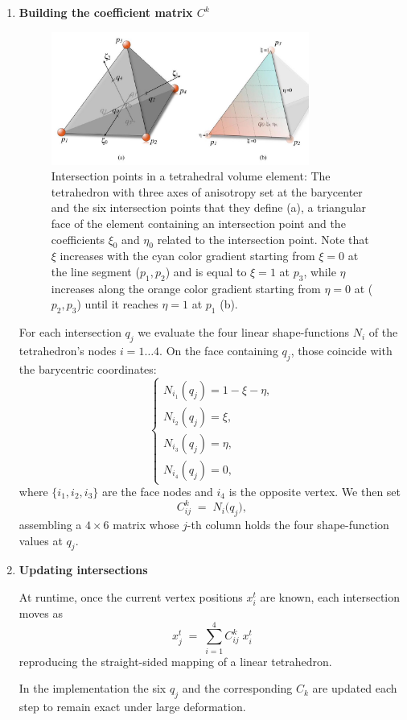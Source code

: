 \documentclass{article}
\begin{document}
\begin{enumerate}
    \item \textbf{Building the coefficient matrix $C^k$}
    \begin{figure}[!ht]
    \centering
    \includegraphics[width=0.8\textwidth]{images/fig2.6.jpg}
    \caption{Intersection points in a tetrahedral volume element: The tetrahedron with three axes of anisotropy set at the barycenter and the six intersection points that they define (a), a triangular face of the element containing an intersection point and the coefficients $\xi_{0}$ and $\eta_{0}$ related to the intersection point. Note that $\xi$ increases with the cyan color gradient starting from $\xi=0$ at the line segment ($p_{1}, p_{2}$) and is equal to $\xi=1$ at $p_{3}$, while $\eta$ increases along the orange color gradient starting from $\eta=0$ at ($p_{2}, p_{3}$) until it reaches $\eta=1$ at $p_{1}$ (b).}
    \label{fig:intersections}
\end{figure}

    For each intersection $q_j$ we evaluate the four linear shape-functions $N_i$ of the tetrahedron’s nodes $i=1\ldots4$. On the face containing $q_j$, those coincide with the barycentric coordinates:
    $$
    \begin{cases}
        N_{i_1}(q_j)=1-\xi-\eta,\\
        N_{i_2}(q_j)=\xi,\\
        N_{i_3}(q_j)=\eta,\\
        N_{i_4}(q_j)=0,
    \end{cases}
    $$
    where $\{i_1,i_2,i_3\}$ are the face nodes and $i_4$ is the opposite vertex. We then set
    $$
    C^k_{ij}\;=\;N_i\bigl(q_j\bigr),
    $$
    assembling a $4\times6$ matrix whose $j$-th column holds the four shape-function values at $q_j$.

    \item \textbf{Updating intersections}
    
    At runtime, once the current vertex positions $x^t_i$ are known, each intersection moves as
    \begin{equation}
        x^t_j \;=\;\sum_{i=1}^4 C^k_{ij}\;x^t_i
        \tag{2.25}
        \label{eq:update_intersections}
    \end{equation}
    reproducing the straight-sided mapping of a linear tetrahedron.
    
    In the implementation the six $q_j$ and the corresponding $C_k$
  are updated each step to remain exact under large deformation.
\end{enumerate}
\end{document}
